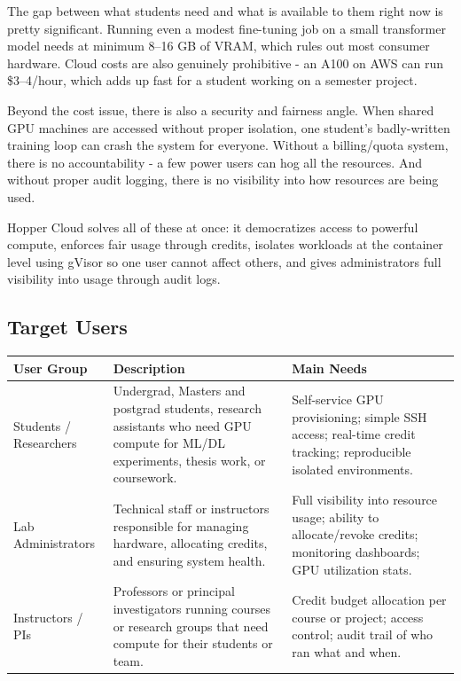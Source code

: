 \documentclass[12pt,a4paper]{article}
\newcommand{\subsubhead}[1]{\vspace{0.4em}{\color{hoppergray}\normalsize\bfseries\itshape #1}\par\vspace{0.2em}}
\begin{document}
\subsubhead{Why Does It Matter?}

The gap between what students need and what is available to them right now is pretty significant. Running even a modest fine-tuning job on a small transformer model needs at minimum 8--16 GB of VRAM, which rules out most consumer hardware. Cloud costs are also genuinely prohibitive - an A100 on AWS can run \$3--4/hour, which adds up fast for a student working on a semester project.

Beyond the cost issue, there is also a security and fairness angle. When shared GPU machines are accessed without proper isolation, one student's badly-written training loop can crash the system for everyone. Without a billing/quota system, there is no accountability - a few power users can hog all the resources. And without proper audit logging, there is no visibility into how resources are being used.

Hopper Cloud solves all of these at once: it democratizes access to powerful compute, enforces fair usage through credits, isolates workloads at the container level using gVisor so one user cannot affect others, and gives administrators full visibility into usage through audit logs.

\subsection{Target Users}

\begin{tabularx}{\textwidth}{@{}L{3.5cm}L{5cm}X@{}}
  \textbf{User Group} & \textbf{Description} & \textbf{Main Needs} \\
  \midrule
  Students / Researchers
    & Undergrad, Masters and postgrad students, research assistants who need GPU compute for ML/DL experiments, thesis work, or coursework.
    & Self-service GPU provisioning; simple SSH access; real-time credit tracking; reproducible isolated environments. \\
  Lab Administrators
    & Technical staff or instructors responsible for managing hardware, allocating credits, and ensuring system health.
    & Full visibility into resource usage;    ability to allocate/revoke credits; monitoring dashboards; GPU utilization stats. \\
  
  Instructors / PIs
    & Professors or principal investigators running courses or research groups that need compute for their students or team.
    & Credit budget allocation per course or project; access control; audit trail of who ran what and when. \\
\end{tabularx}
\end{document}
